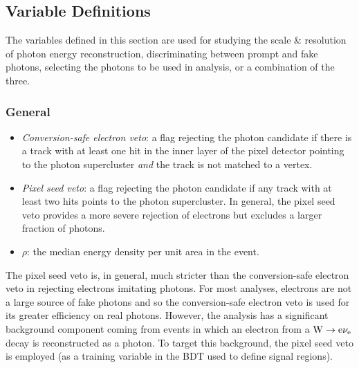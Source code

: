 \subsection{Variable Definitions} \label{sec:evt_photon_vardef}
The variables defined in this section are used for studying the scale \& resolution of photon energy reconstruction, discriminating between prompt and fake photons, selecting the photons to be used in analysis, or a combination of the three.

\subsubsection*{General}
\begin{itemize}
    \item \emph{Conversion-safe electron veto}: a flag rejecting the photon candidate if there is a track with at least one hit in the inner layer of the pixel detector pointing to the photon supercluster \emph{and} the track is not matched to a vertex. 
    \item \emph{Pixel seed veto}: a flag rejecting the photon candidate if any track with at least two hits points to the photon supercluster. In general, the pixel seed veto provides a more severe rejection of electrons but excludes a larger fraction of photons.
    \item $\rho$: the median energy density per unit area in the event. 
\end{itemize}

The pixel seed veto is, in general, much stricter than the conversion-safe electron veto in rejecting electrons imitating photons.
For most \Hgg analyses, electrons are not a large source of fake photons and so the conversion-safe electron veto is used for its greater efficiency on real photons.
However, the \ttH analysis has a significant background component coming from \ttplusX events in which an electron from a $\mathrm{W} \to \mathrm{e}\nu_{\mathrm{e}}$ decay is reconstructed as a photon.
To target this background, the pixel seed veto is employed (as a training variable in the BDT used to define signal regions).

